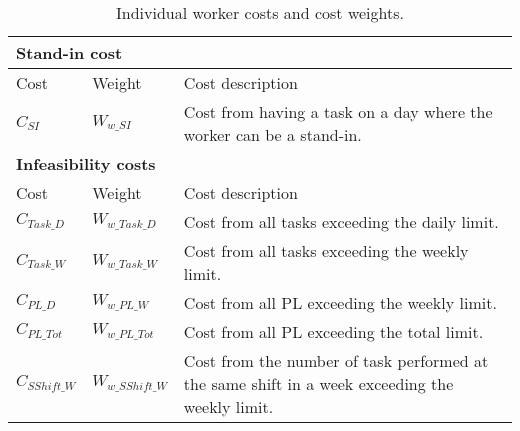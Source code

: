 \begin{table}[!h]
\centering
\caption{Individual worker costs and cost weights.}
\label{tab:worker_costs}
\begin{tabular}{|l|l|p{7cm}|}
\hline
\multicolumn{3}{|l|}{\cellcolor{gray!90} \textbf{Stand-in cost}} \\ \hline
\rowcolor{Gray} Cost & Weight & Cost description \\ \hline
$C_{SI}$ & $W_{w\_SI}$ & Cost from having a task on a day where the worker can be a stand-in. \\ \hline
\multicolumn{3}{|l|}{\cellcolor{gray!90} \textbf{Infeasibility costs}} \\ \hline
\rowcolor{Gray} Cost & Weight & Cost description \\ \hline
$C_{Task\_D}$ & $W_{w\_Task\_D}$ & Cost from all tasks exceeding the daily limit. \\ \hline
$C_{Task\_W}$ & $W_{w\_Task\_W}$ & Cost from all tasks exceeding the weekly limit.  \\ \hline
$C_{PL\_D}$ & $W_{w\_PL\_W}$ & Cost from all PL exceeding the weekly limit. \\ \hline
$C_{PL\_Tot}$ & $W_{w\_PL\_Tot}$ & Cost from all PL exceeding the total limit. \\ \hline
$C_{SShift\_W}$ & $W_{w\_SShift\_W}$ & Cost from the number of task performed at the same shift in a week exceeding the weekly limit. \\ \hline
\end{tabular}
\end{table}

